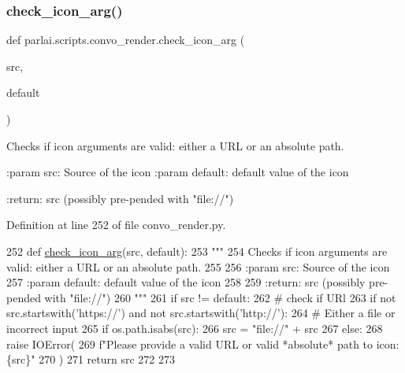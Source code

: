 \subsubsection{\texorpdfstring{check\+\_\+icon\+\_\+arg()}{check\_icon\_arg()}}
{\footnotesize\ttfamily def parlai.\+scripts.\+convo\+\_\+render.\+check\+\_\+icon\+\_\+arg (\begin{DoxyParamCaption}\item[{}]{src,  }\item[{}]{default }\end{DoxyParamCaption})}

\begin{DoxyVerb}Checks if icon arguments are valid: either a URL or an absolute path.

:param src: Source of the icon
:param default: default value of the icon

:return: src (possibly pre-pended with "file://")
\end{DoxyVerb}
 

Definition at line 252 of file convo\+\_\+render.\+py.


\begin{DoxyCode}
252 \textcolor{keyword}{def }\hyperlink{namespaceparlai_1_1scripts_1_1convo__render_ac7e3c84a7f6e3b488360319b597eda18}{check\_icon\_arg}(src, default):
253     \textcolor{stringliteral}{"""}
254 \textcolor{stringliteral}{    Checks if icon arguments are valid: either a URL or an absolute path.}
255 \textcolor{stringliteral}{}
256 \textcolor{stringliteral}{    :param src: Source of the icon}
257 \textcolor{stringliteral}{    :param default: default value of the icon}
258 \textcolor{stringliteral}{}
259 \textcolor{stringliteral}{    :return: src (possibly pre-pended with "file://")}
260 \textcolor{stringliteral}{    """}
261     \textcolor{keywordflow}{if} src != default:
262         \textcolor{comment}{# check if URl}
263         \textcolor{keywordflow}{if} \textcolor{keywordflow}{not} src.startswith(\textcolor{stringliteral}{'https://'}) \textcolor{keywordflow}{and} \textcolor{keywordflow}{not} src.startswith(\textcolor{stringliteral}{'http://'}):
264             \textcolor{comment}{# Either a file or incorrect input}
265             \textcolor{keywordflow}{if} os.path.isabs(src):
266                 src = \textcolor{stringliteral}{"file://"} + src
267             \textcolor{keywordflow}{else}:
268                 \textcolor{keywordflow}{raise} IOError(
269                     f\textcolor{stringliteral}{"Please provide a valid URL or valid *absolute* path to icon: \{src\}"}
270                 )
271     \textcolor{keywordflow}{return} src
272 
273 
\end{DoxyCode}
\mbox{\label{namespaceparlai_1_1scripts_1_1convo__render_a4220e40f3e0c5ac320177b6e0f3d8e83}} 
